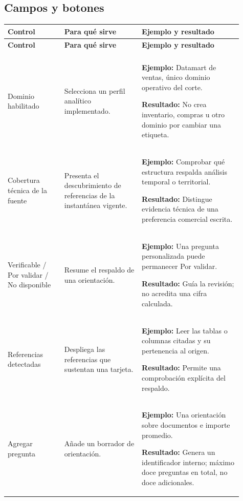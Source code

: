 \subsection{Campos y botones}
\begingroup
\fontsize{10}{12.5}\selectfont
\setlength{\tabcolsep}{5pt}
\renewcommand{\arraystretch}{1.15}
\begin{longtable}{@{}>{\RaggedRight\arraybackslash}p{0.22\linewidth}>{\RaggedRight\arraybackslash}p{0.3\linewidth}>{\RaggedRight\arraybackslash}p{0.39\linewidth}@{}}
\toprule
\textbf{Control} & \textbf{Para qué sirve} & \textbf{Ejemplo y resultado} \\
\midrule
\endfirsthead
\toprule
\textbf{Control} & \textbf{Para qué sirve} & \textbf{Ejemplo y resultado} \\
\midrule
\endhead
\midrule
\multicolumn{3}{r}{\footnotesize Continúa en la página siguiente}\\
\endfoot
\bottomrule
\endlastfoot
Dominio habilitado & Selecciona un perfil analítico implementado. & \textbf{Ejemplo:} Datamart de ventas, único dominio operativo del corte.\par\smallskip\textbf{Resultado:} No crea inventario, compras u otro dominio por cambiar una etiqueta. \\
\addlinespace[3pt]
Cobertura técnica de la fuente & Presenta el descubrimiento de referencias de la instantánea vigente. & \textbf{Ejemplo:} Comprobar qué estructura respalda análisis temporal o territorial.\par\smallskip\textbf{Resultado:} Distingue evidencia técnica de una preferencia comercial escrita. \\
\addlinespace[3pt]
Verificable / Por validar / No disponible & Resume el respaldo de una orientación. & \textbf{Ejemplo:} Una pregunta personalizada puede permanecer Por validar.\par\smallskip\textbf{Resultado:} Guía la revisión; no acredita una cifra calculada. \\
\addlinespace[3pt]
Referencias detectadas & Despliega las referencias que sustentan una tarjeta. & \textbf{Ejemplo:} Leer las tablas o columnas citadas y su pertenencia al origen.\par\smallskip\textbf{Resultado:} Permite una comprobación explícita del respaldo. \\
\addlinespace[3pt]
Agregar pregunta & Añade un borrador de orientación. & \textbf{Ejemplo:} Una orientación sobre documentos e importe promedio.\par\smallskip\textbf{Resultado:} Genera un identificador interno; máximo doce preguntas en total, no doce adicionales. \\

\end{longtable}
